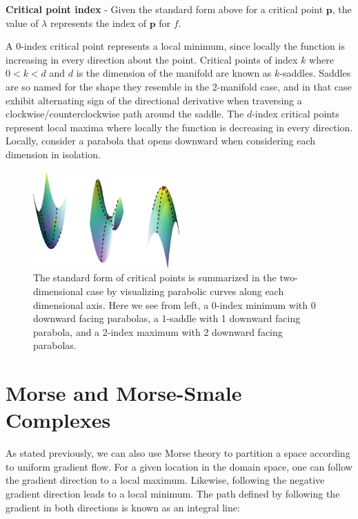 \begin{defn}
\textbf{Critical point index} - Given the standard form above for a critical point $\mathbf{p}$, the value of $\lambda$ represents the index of $\mathbf{p}$ for $f$.
\end{defn}

A 0-index critical point represents a local minimum, since locally the function is increasing in every direction about the point. Critical points of index $k$ where $0 < k < d$ and $d$ is the dimension of the manifold are known as $k$-saddles.
%
Saddles are so named for the shape they resemble in the 2-manifold case, and in that case exhibit alternating sign of the directional derivative when traversing a clockwise/counterclockwise path around the saddle.
%
The $d$-index critical points represent local maxima where locally the function is decreasing in every direction. Locally, consider a parabola that opens downward when considering each dimension in isolation.

\begin{figure}[!ht]
  \centering
  \includegraphics[width=0.5\textwidth]{figs/chap4/criticalPoints}
  \caption[Critical Points of Varying Index]{The standard form of critical points is summarized in the two-dimensional case by visualizing parabolic curves along each dimensional axis. Here we see from left, a 0-index minimum with 0 downward facing parabolas, a 1-saddle with 1 downward facing parabola, and a 2-index maximum with 2 downward facing parabolas.}
  \label{fig:critical_points}
\end{figure}

\section{Morse and Morse-Smale Complexes}

As stated previously, we can also use Morse theory to partition a space according to uniform gradient flow.
%
For a given location in the domain space, one can follow the gradient direction to a local maximum.
%
Likewise, following the negative gradient direction leads to a local minimum.
%
The path defined by following the gradient in both directions is known as an integral line:

